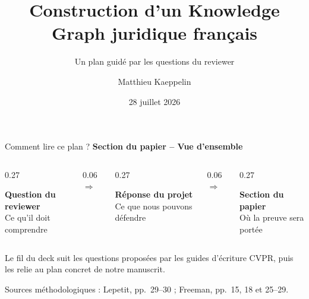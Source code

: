 \documentclass[aspectratio=169,10pt]{beamer}
\title[Plan papier KG juridique FR]{Construction d'un Knowledge Graph juridique français}
\subtitle{Un plan guidé par les questions du reviewer}
\author{Matthieu Kaeppelin}
\institute{Stage FE Recherche}
\date{28 juillet 2026}
\newcommand{\keybox}[1]{%
  \begin{center}
  \colorbox{accentsoft}{\parbox{0.92\linewidth}{\centering #1}}
  \end{center}}
\newcommand{\papersection}[1]{%
  {\scriptsize\textcolor{accent}{\textbf{Section du papier -- #1}}}\par\vspace{0.55em}}
\begin{document}
\begin{frame}
  \titlepage
\end{frame}

\begin{frame}{Comment lire ce plan ?}
  \papersection{Vue d'ensemble}
  \footnotesize
  \begin{columns}[c,onlytextwidth]
    \begin{column}{0.27\textwidth}
      \centering
      \colorbox{accentsoft}{\parbox{0.90\linewidth}{\centering\vspace{1.0em}
      \textbf{Question du reviewer}\\[0.45em]
      Ce qu'il doit comprendre
      \vspace{1.0em}}}
    \end{column}
    \begin{column}{0.06\textwidth}\centering$\Longrightarrow$\end{column}
    \begin{column}{0.27\textwidth}
      \centering
      \colorbox{green!10}{\parbox{0.90\linewidth}{\centering\vspace{1.0em}
      \textbf{Réponse du projet}\\[0.45em]
      Ce que nous pouvons défendre
      \vspace{1.0em}}}
    \end{column}
    \begin{column}{0.06\textwidth}\centering$\Longrightarrow$\end{column}
    \begin{column}{0.27\textwidth}
      \centering
      \colorbox{orange!12}{\parbox{0.90\linewidth}{\centering\vspace{1.0em}
      \textbf{Section du papier}\\[0.45em]
      Où la preuve sera portée
      \vspace{1.0em}}}
    \end{column}
  \end{columns}

  \vspace{1.0em}
  \keybox{\scriptsize Le fil du deck suit les questions proposées par les guides d'écriture CVPR,
  puis les relie au plan concret de notre manuscrit.}

  {\tiny Sources méthodologiques : Lepetit, pp.~29--30 ; Freeman, pp.~15, 18 et 25--29.}
\end{frame}
\end{document}
